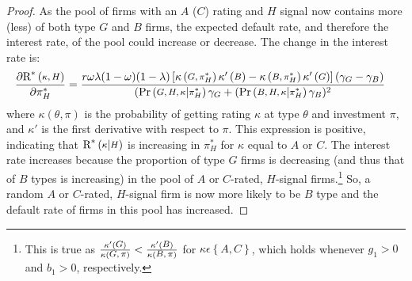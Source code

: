 \documentclass{report}
\begin{document}
\begin{proof}
As the pool of firms with an $A$ ($C$) rating and $H$ signal now contains more (less) of both type $G$ and $B$ firms, the expected default rate, and therefore the interest rate, of the pool could increase or decrease. The change in the interest rate is:
\begin{align}
\frac{\partial \textup{R}^{*}\left(\medmath{\kappa,H}\right)}{\partial \pi^{*}_{H}} &= %
\frac{r\omega\lambda(1-\omega)(1-\lambda)\left[\kappa\left(\medmath{G,\pi^{*}_{H}}\right)\kappa'\left(\medmath{B}\right)-\kappa\left(\medmath{B,\pi^{*}_{H}}\right)\kappa'\left(\medmath{G}\right)\right](\gamma_{G}-\gamma_{B})}{(\textup{Pr}\left(\medmath{G,H,\kappa}|\medmath{\pi^{*}_{H}}\right)\gamma_G + (\textup{Pr}\left(\medmath{B,H,\kappa}|\medmath{\pi^{*}_{H}}\right)\gamma_B)^2}
\end{align}
where $\kappa(\theta,\pi)$ is the probability of getting rating $\kappa$ at type $\theta$ and investment $\pi$, and $\kappa'$ is the first derivative with respect to $\pi$. This expression is positive, indicating that $\textup{R}^{*}\left(\medmath{\kappa}|\medmath{H}\right)$ is increasing in $\pi^{*}_{H}$ for $\kappa$ equal to $A$ or $C$. The interest rate increases because the proportion of type $G$ firms is decreasing (and thus that of $B$ types is increasing) in the pool of $A$ or $C$-rated, $H$-signal firms.\footnote{This is true as $\frac{\kappa'(\medmath{G})}{\kappa(\medmath{G,\pi})}<\frac{\kappa'(\medmath{B})}{\kappa(\medmath{B,\pi})}$ for $\kappa\epsilon\left\{A,C\right\}$, which holds whenever $g_{1}>0$ and $b_{1}>0$, respectively.} So, a random $A$ or $C$-rated, $H$-signal firm is now more likely to be $B$ type and the default rate of firms in this pool has increased.


\end{proof}
\end{document}

